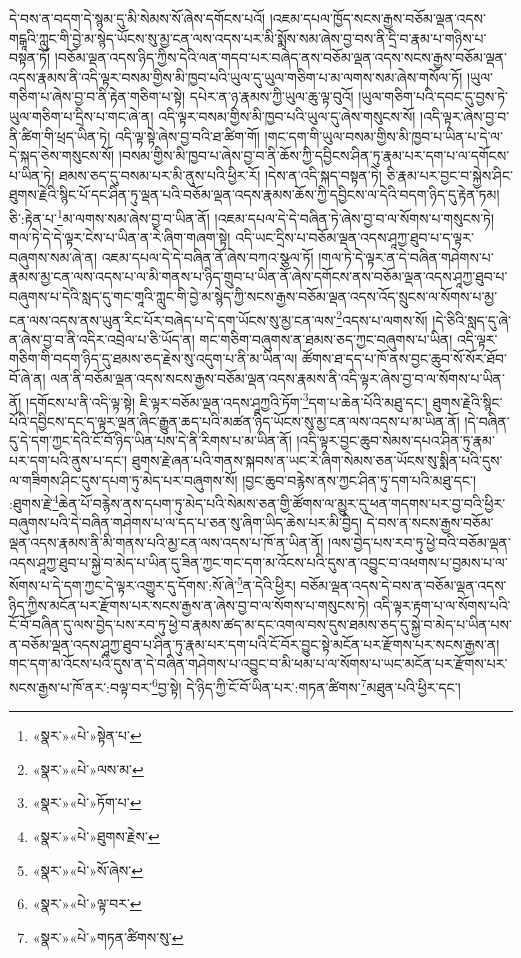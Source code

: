 དེ་བས་ན་བདག་དེ་སྙམ་དུ་མི་སེམས་སོ་ཞེས་དགོངས་པའོ། །འཇམ་དཔལ་ཁྱོད་སངས་རྒྱས་བཅོམ་ལྡན་འདས་གངྒཱའི་ཀླུང་གི་བྱེ་མ་སྙེད་ཡོངས་སུ་མྱ་ངན་ལས་འདས་པར་མི་སྨོས་སམ་ཞེས་བྱ་བས་ནི་དྲི་བ་རྣམ་པ་གཉིས་པ་བསྟན་ཏོ། །བཅོམ་ལྡན་འདས་ཉིད་ཀྱིས་དེའི་ལན་གདབ་པར་བཞེད་ནས་བཅོམ་ལྡན་འདས་སངས་རྒྱས་བཅོམ་ལྡན་འདས་རྣམས་ནི་འདི་ལྟར་བསམ་གྱིས་མི་ཁྱབ་པའི་ཡུལ་དུ་ཡུལ་གཅིག་པ་མ་ལགས་སམ་ཞེས་གསོལ་ཏོ། །ཡུལ་གཅིག་པ་ཞེས་བྱ་བ་ནི་རྟེན་གཅིག་པ་སྟེ། དཔེར་ན་ཉ་རྣམས་ཀྱི་ཡུལ་ཆུ་ལྟ་བུའོ། །ཡུལ་གཅིག་པའི་དབང་དུ་བྱས་ཏེ་ཡུལ་གཅིག་པ་དྲིས་པ་གང་ཞེ་ན། འདི་ལྟར་བསམ་གྱིས་མི་ཁྱབ་པའི་ཡུལ་དུ་ཞེས་གསུངས་སོ། །འདི་ལྟར་ཞེས་བྱ་བ་ནི་ཚིག་གི་ཕྲད་ཡིན་ཏེ། འདི་ལྟ་སྟེ་ཞེས་བྱ་བའི་ཐ་ཚིག་གོ། །གང་དག་གི་ཡུལ་བསམ་གྱིས་མི་ཁྱབ་པ་ཡིན་པ་དེ་ལ་དེ་སྐད་ཅེས་གསུངས་སོ། །བསམ་གྱིས་མི་ཁྱབ་པ་ཞེས་བྱ་བ་ནི་ཆོས་ཀྱི་དབྱིངས་ཤིན་ཏུ་རྣམ་པར་དག་པ་ལ་དགོངས་པ་ཡིན་ཏེ། ཐམས་ཅད་དུ་བསམ་པར་མི་ནུས་པའི་ཕྱིར་རོ། །དེས་ན་འདི་སྐད་བསྟན་ཏེ། ཅི་རྣམ་པར་བྱང་བ་སྐྱེས་ཤིང་ཐུགས་རྗེའི་སྙིང་པོ་དང་ཤིན་ཏུ་ལྡན་པའི་བཅོམ་ལྡན་འདས་རྣམས་ཆོས་ཀྱི་དབྱིངས་ལ་དེའི་བདག་ཉིད་དུ་རྟེན་ཏམ། ཅི་:རྟེན་པ་\footnote{«སྣར་»«པེ་»སྟེན་པ་}མ་ལགས་སམ་ཞེས་བྱ་བ་ཡིན་ནོ། །འཇམ་དཔལ་དེ་དེ་བཞིན་ཏེ་ཞེས་བྱ་བ་ལ་སོགས་པ་གསུངས་ཏེ། གལ་ཏེ་དེ་དེ་ལྟར་ངེས་པ་ཡིན་ན་རེ་ཞིག་གཞག་སྟེ། འདི་ཡང་དྲིས་པ་བཅོམ་ལྡན་འདས་ཤཱཀྱ་ཐུབ་པ་ད་ལྟར་བཞུགས་སམ་ཞེ་ན། འཇམ་དཔལ་དེ་དེ་བཞིན་ནོ་ཞེས་བཀའ་སྩལ་ཏོ། །གལ་ཏེ་དེ་ལྟར་ན་དེ་བཞིན་གཤེགས་པ་རྣམས་མྱ་ངན་ལས་འདས་པ་ལ་མི་གནས་པ་ཉིད་གྲུབ་པ་ཡིན་ནོ་ཞེས་དགོངས་ནས་བཅོམ་ལྡན་འདས་ཤཱཀྱ་ཐུབ་པ་བཞུགས་པ་དེའི་སླད་དུ་གང་གཱའི་ཀླུང་གི་བྱེ་མ་སྙེད་ཀྱི་སངས་རྒྱས་བཅོམ་ལྡན་འདས་འོད་སྲུངས་ལ་སོགས་པ་མྱ་ངན་ལས་འདས་ནས་ཡུན་རིང་པོར་བཞེད་པ་དེ་དག་ཡོངས་སུ་མྱ་ངན་ལས་\footnote{«སྣར་»«པེ་»ལས་མ་}འདས་པ་ལགས་སོ། །དེ་ཅིའི་སླད་དུ་ཞེ་ན་ཞེས་བྱ་བ་ནི་འདིར་འབྲེལ་པ་ཅི་ཡོད་ན། གང་གཅིག་བཞུགས་ན་ཐམས་ཅད་ཀྱང་བཞུགས་པ་ཡིན། འདི་ལྟར་གཅིག་གི་བདག་ཉིད་དུ་ཐམས་ཅད་རྗེས་སུ་འདུག་པ་ནི་མ་ཡིན་ལ། ཚོགས་ཐ་དད་པ་ཁོ་ནས་བྱང་ཆུབ་སོ་སོར་ཐོབ་བོ་ཞེ་ན། ལན་ནི་བཅོམ་ལྡན་འདས་སངས་རྒྱས་བཅོམ་ལྡན་འདས་རྣམས་ནི་འདི་ལྟར་ཞེས་བྱ་བ་ལ་སོགས་པ་ཡིན་ནོ། །དགོངས་པ་ནི་འདི་ལྟ་སྟེ། ཇི་ལྟར་བཅོམ་ལྡན་འདས་ཤཱཀྱའི་ཏོག་\footnote{«སྣར་»«པེ་»ཏོག་པ་}དག་པ་ཆེན་པོའི་མཐུ་དང་། ཐུགས་རྗེའི་སྙིང་པོའི་དབྱིངས་དང་ད་ལྟར་ལྡན་ཞིང་རྒྱུན་ཆད་པའི་མཚན་ཉིད་ཡོངས་སུ་མྱ་ངན་ལས་འདས་པ་མ་ཡིན་ནོ། །དེ་བཞིན་དུ་དེ་དག་ཀྱང་དེའི་ངོ་བོ་ཉིད་ཡིན་པས་དེ་ནི་རིགས་པ་མ་ཡིན་ནོ། །འདི་ལྟར་བྱང་ཆུབ་སེམས་དཔའ་ཤིན་ཏུ་རྣམ་པར་དག་པའི་ནུས་པ་དང་། ཐུགས་རྗེ་ཞན་པའི་གནས་སྐབས་ན་ཡང་རེ་ཞིག་སེམས་ཅན་ཡོངས་སུ་སྨིན་པའི་དུས་ལ་གཟིགས་ཤིང་དུས་དཔག་ཏུ་མེད་པར་བཞུགས་སོ། །བྱང་ཆུབ་བརྙེས་ནས་ཀྱང་ཤིན་ཏུ་དག་པའི་མཐུ་དང་། :ཐུགས་རྗེ་\footnote{«སྣར་»«པེ་»ཐུགས་རྗེས་}ཆེན་པོ་བརྙེས་ནས་དཔག་ཏུ་མེད་པའི་སེམས་ཅན་གྱི་ཚོགས་ལ་མྱུར་དུ་ཕན་གདགས་པར་བྱ་བའི་ཕྱིར་བཞུགས་པའི་དེ་བཞིན་གཤེགས་པ་ལ་དད་པ་ཅན་སུ་ཞིག་ཡིད་ཆེས་པར་མི་བྱེད། དེ་བས་ན་སངས་རྒྱས་བཅོམ་ལྡན་འདས་རྣམས་ནི་མི་གནས་པའི་མྱ་ངན་ལས་འདས་པ་ཁོ་ན་ཡིན་ནོ། །ལས་བྱེད་པས་རབ་ཏུ་ཕྱེ་བའི་བཅོམ་ལྡན་འདས་ཤཱཀྱ་ཐུབ་པ་སྐྱེ་བ་མེད་པ་ཡིན་དུ་ཟིན་ཀྱང་གང་དག་མ་འོངས་པའི་དུས་ན་འབྱུང་བ་འཕགས་པ་བྱམས་པ་ལ་སོགས་པ་དེ་དག་ཀྱང་དེ་ལྟར་འགྱུར་དུ་དོགས་:སོ་ཞེ་\footnote{«སྣར་»«པེ་»སོ་ཞེས་}ན་དེའི་ཕྱིར། བཅོམ་ལྡན་འདས་དེ་བས་ན་བཅོམ་ལྡན་འདས་ཉིད་ཀྱིས་མངོན་པར་རྫོགས་པར་སངས་རྒྱས་ན་ཞེས་བྱ་བ་ལ་སོགས་པ་གསུངས་ཏེ། འདི་ལྟར་རྟག་པ་ལ་སོགས་པའི་ངོ་བོ་བཞིན་དུ་ལས་བྱེད་པས་རབ་ཏུ་ཕྱེ་བ་རྣམས་ཚད་མ་དང་འགལ་བས་དུས་ཐམས་ཅད་དུ་སྐྱེ་བ་མེད་པ་ཡིན་པས་ན་བཅོམ་ལྡན་འདས་ཤཱཀྱ་ཐུབ་པ་ཤིན་ཏུ་རྣམ་པར་དག་པའི་ངོ་བོར་བྱུང་སྟེ་མངོན་པར་རྫོགས་པར་སངས་རྒྱས་ན། གང་དག་མ་འོངས་པའི་དུས་ན་དེ་བཞིན་གཤེགས་པ་འབྱུང་བ་མི་ཕམ་པ་ལ་སོགས་པ་ཡང་མངོན་པར་རྫོགས་པར་སངས་རྒྱས་པ་ཁོ་ནར་:བལྟ་བར་\footnote{«སྣར་»«པེ་»ལྟ་བར་}བྱ་སྟེ། དེ་ཉིད་ཀྱི་ངོ་བོ་ཡིན་པར་:གཏན་ཚིགས་\footnote{«སྣར་»«པེ་»གཏན་ཚིགས་སུ་}མཐུན་པའི་ཕྱིར་དང་། 